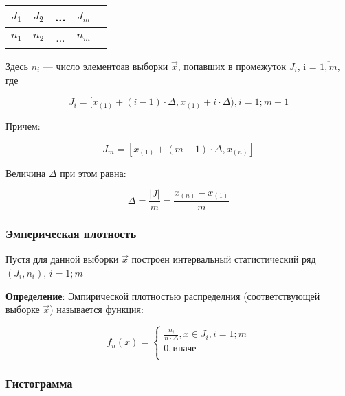 \begin{table}[htb]
    \centering
    \begin{tabular}{|c|c|c|c|c|}
        \hline
        $J_1$ & $J_2$ & ... & $J_m$ \\
        \hline
        $n_1$ & $n_2$ & ... & $n_m$ \\
        \hline
    \end{tabular}
\end{table}

Здесь $n_i$ --- число элементоав выборки $\vec x$, попавших в промежуток $J_i$, i = $\overline{1, m}$, где

\begin{equation}
    J_i = [x_{(1)} + (i - 1) \cdot \Delta, x_{(1)} + i \cdot \Delta), i = \overline{1; m - 1}
\end{equation}

Причем:

\begin{equation}
    J_{m} = [x_{(1)} + (m - 1) \cdot \Delta, x_{(n)}]
\end{equation}

Величина $\Delta$ при этом равна:

\begin{equation}
    \Delta = \frac{|J|}{m} = \frac{x_{(n)} - x_{(1)}}{m}
\end{equation}


\subsubsection{Эмперическая плотность}

Пустя для данной выборки $\vec x$ построен интервальный статистический ряд $(J_i, n_i)$, $i = \overline{1; m}$\newline

\textbf{\underline{Определение}}: Эмпирической плотностью распределния (соответствующей выборке $\vec x$) называется функция:

\begin{equation}
    f_n(x) =
    \begin{cases}
        \frac{n_i}{n \cdot \Delta}, x \in J_i, i = \overline{1; m} \\
        0, \text{иначе} \\
    \end{cases}
\end{equation}


\subsubsection{Гистограмма}

